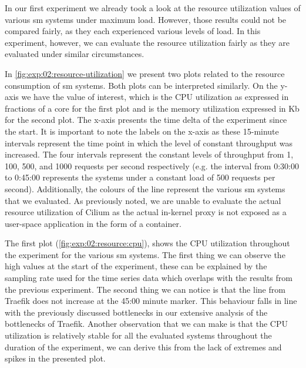 In our first experiment we already took a look at the resource utilization values of various \gls{sm} systems under maximum load. However, those results could not be compared fairly, as they each experienced various levels of load. In this experiment, however, we can evaluate the resource utilization fairly as they are evaluated under similar circumstances. 

In \cref{fig:exp:02:resource-utilization} we present two plots related to the resource consumption of \gls{sm} systems. Both plots can be interpreted similarly. On the y-axis we have the value of interest, which is the CPU utilization as expressed in fractions of a core for the first plot and is the memory utilization expressed in Kb for the second plot. The x-axis presents the time delta of the experiment since the start. It is important to note the labels on the x-axis as these 15-minute intervals represent the time point in which the level of constant throughput was increased. The four intervals represent the constant levels of throughput from 1, 100, 500, and 1000 requests per second respectively (e.g. the interval from 0:30:00 to 0:45:00 represents the systems under a constant load of 500 requests per second). Additionally, the colours of the line represent the various \gls{sm} systems that we evaluated. As previously noted, we are unable to evaluate the actual resource utilization of Cilium as the actual in-kernel proxy is not exposed as a user-space application in the form of a container.

The first plot (\cref{fig:exp:02:resource:cpu}), shows the CPU utilization throughout the experiment for the various \gls{sm} systems. The first thing we can observe the high values at the start of the experiment, these can be explained by the sampling rate used for the time series data which overlaps with the results from the previous experiment. The second thing we can notice is that the line from Traefik does not increase at the 45:00 minute marker. This behaviour falls in line with the previously discussed bottlenecks in our extensive analysis of the bottlenecks of Traefik. Another observation that we can make is that the CPU utilization is relatively stable for all the evaluated systems throughout the duration of the experiment, we can derive this from the lack of extremes and spikes in the presented plot.

